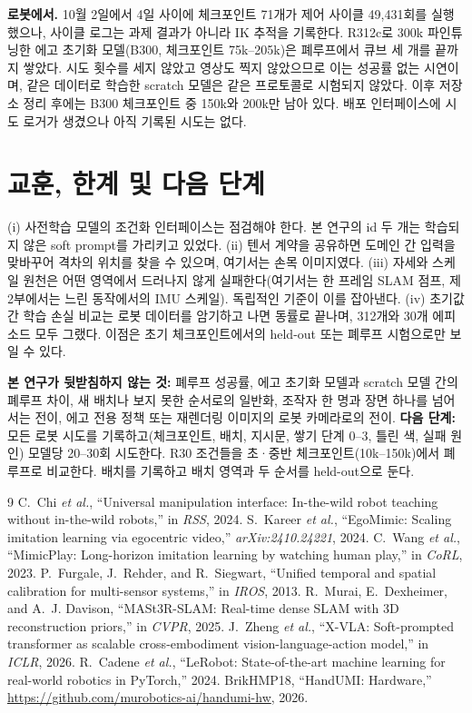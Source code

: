\documentclass[conference,10pt]{IEEEtran}
\begin{document}
\textbf{로봇에서.} 10월 2일에서 4일 사이에 체크포인트 71개가 제어 사이클 49{,}431회를 실행했으나, 사이클 로그는 과제 결과가 아니라
IK 추적을 기록한다. R312c로 300k 파인튜닝한 에고 초기화 모델(B300, 체크포인트 75k--205k)은 폐루프에서 큐브 세 개를 끝까지 쌓았다.
시도 횟수를 세지 않았고 영상도 찍지 않았으므로 이는 성공률 없는 시연이며, 같은 데이터로 학습한 scratch 모델은 같은 프로토콜로
시험되지 않았다. 이후 저장소 정리 후에는 B300 체크포인트 중 150k와 200k만 남아 있다. 배포 인터페이스에 시도 로거가 생겼으나 아직
기록된 시도는 없다.

\section{교훈, 한계 및 다음 단계}
(i) 사전학습 모델의 조건화 인터페이스는 점검해야 한다. 본 연구의 id 두 개는 학습되지 않은 soft prompt를 가리키고 있었다. (ii) 텐서
계약을 공유하면 도메인 간 입력을 맞바꾸어 격차의 위치를 찾을 수 있으며, 여기서는 손목 이미지였다. (iii) 자세와 스케일 원천은 어떤
영역에서 드러나지 않게 실패한다(여기서는 한 프레임 SLAM 점프, 제2부에서는 느린 동작에서의 IMU 스케일). 독립적인 기준이 이를 잡아낸다.
(iv) 초기값 간 학습 손실 비교는 로봇 데이터를 암기하고 나면 동률로 끝나며, 312개와 30개 에피소드 모두 그랬다. 이점은 초기
체크포인트에서의 held-out 또는 폐루프 시험으로만 보일 수 있다.

\textbf{본 연구가 뒷받침하지 않는 것:} 폐루프 성공률, 에고 초기화 모델과 scratch 모델 간의 폐루프 차이, 새 배치나 보지 못한 순서로의
일반화, 조작자 한 명과 장면 하나를 넘어서는 전이, 에고 전용 정책 또는 재렌더링 이미지의 로봇 카메라로의 전이. \textbf{다음 단계:} 모든
로봇 시도를 기록하고(체크포인트, 배치, 지시문, 쌓기 단계 0--3, 틀린 색, 실패 원인) 모델당 20--30회 시도한다. R30 조건들을 초·중반
체크포인트(10k--150k)에서 폐루프로 비교한다. 배치를 기록하고 배치 영역과 두 순서를 held-out으로 둔다.

\begin{thebibliography}{9}\footnotesize
{} C.~Chi \emph{et al.}, ``Universal manipulation interface: In-the-wild robot teaching without in-the-wild robots,'' in \emph{RSS}, 2024.
 S.~Kareer \emph{et al.}, ``EgoMimic: Scaling imitation learning via egocentric video,'' \emph{arXiv:2410.24221}, 2024.
 C.~Wang \emph{et al.}, ``MimicPlay: Long-horizon imitation learning by watching human play,'' in \emph{CoRL}, 2023.
 P.~Furgale, J.~Rehder, and R.~Siegwart, ``Unified temporal and spatial calibration for multi-sensor systems,'' in \emph{IROS}, 2013.
 R.~Murai, E.~Dexheimer, and A.~J. Davison, ``MASt3R-SLAM: Real-time dense SLAM with 3D reconstruction priors,'' in \emph{CVPR}, 2025.
 J.~Zheng \emph{et al.}, ``X-VLA: Soft-prompted transformer as scalable cross-embodiment vision-language-action model,'' in \emph{ICLR}, 2026.
 R.~Cadene \emph{et al.}, ``LeRobot: State-of-the-art machine learning for real-world robotics in PyTorch,'' 2024.
 BrikHMP18, ``HandUMI: Hardware,'' \url{https://github.com/murobotics-ai/handumi-hw}, 2026.
\end{thebibliography}
\end{document}
